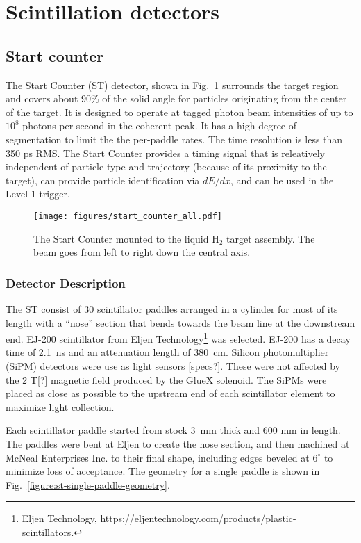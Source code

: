 \section[Scintillation detectors (Mark I./Beni)]{Scintillation detectors \label{sec:scintillators}}
\subsection{Start counter \label{sec:st}}

The Start Counter (ST) detector, shown in Fig.~\ref{fig:st-overview-drawing}
surrounds the target
region and covers about 90\% of the solid angle for particles
originating from the center of the target. It is designed to operate
at tagged photon beam intensities of up to $10^8$ photons per second
in the coherent peak. It has a high degree of segmentation to limit
the the per-paddle rates. The time resolution is less than 350 ps
RMS. The Start Counter provides a timing signal that is releatively
independent of particle type and trajectory (because of its proximity
to the target), can provide particle identification via $dE/dx$, and
can be used in the Level 1 trigger.

\begin{figure}[!htb]
\centering
\texttt{[image: figures/start\_counter\_all.pdf]}
\caption{The \gx{} Start Counter mounted to the liquid $\mathrm{H_2}$
  target assembly.  The beam goes from left to right down the central
  axis.\label{fig:st-overview-drawing}}
\end{figure}

\subsubsection{Detector Description}

The ST consist of 30 scintillator paddles arranged in a cylinder for most of
its length with a ``nose'' section that bends towards the beam line at
the downstream end. EJ-200 scintillator from Eljen
Technology\footnote{Eljen Technology, https://eljentechnology.com/products/plastic-scintillators.
	}
was selected. EJ-200 has a decay time
of 2.1~ns and an attenuation length of 380~cm. Silicon
photomultiplier (SiPM) detectors were use as light sensors [specs?]. These were
not affected by the 2 T[?] magnetic field produced by the GlueX
solenoid. The SiPMs were placed as close as possible to the upstream
end of each scintillator element to maximize light collection.

Each scintillator paddle started from stock 3~mm thick and 600 mm in
length. The paddles were bent at Eljen to create the nose section, and
then machined at McNeal Enterprises Inc.\cite{mcneal-reference} to
their final shape, including edges beveled at $6^\circ$ to minimize
loss of acceptance. The geometry for a single paddle is shown in
Fig.~\ref{figure:st-single-paddle-geometry}.

